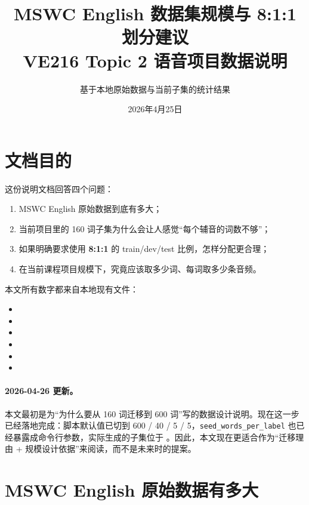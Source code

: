 \documentclass[11pt,a4paper]{ctexart}
\title{MSWC English 数据集规模与 8:1:1 划分建议\\\large VE216 Topic 2 语音项目数据说明}
\author{基于本地原始数据与当前子集的统计结果}
\date{2026年4月25日}
\begin{document}
\maketitle

\section{文档目的}

这份说明文档回答四个问题：
\begin{enumerate}[nosep]
    \item MSWC English 原始数据到底有多大；
    \item 当前项目里的 160 词子集为什么会让人感觉“每个辅音的词数不够”；
    \item 如果明确要求使用 \textbf{8:1:1} 的 train/dev/test 比例，怎样分配更合理；
    \item 在当前课程项目规模下，究竟应该取多少词、每词取多少条音频。
\end{enumerate}

本文所有数字都来自本地现有文件：
\begin{itemize}[nosep]
    \item {}
    \item {}
    \item {}
    \item {}
    \item {}
    \item {}
\end{itemize}

\paragraph{2026-04-26 更新。}
本文最初是为“为什么要从 160 词迁移到 600 词”写的数据设计说明。现在这一步已经落地完成：脚本默认值已切到 600 / 40 / 5 / 5，\texttt{seed\_words\_per\_label} 也已经暴露成命令行参数，实际生成的子集位于 。因此，本文现在更适合作为“迁移理由 + 规模设计依据”来阅读，而不是未来时的提案。

\section{MSWC English 原始数据有多大}
\end{document}
